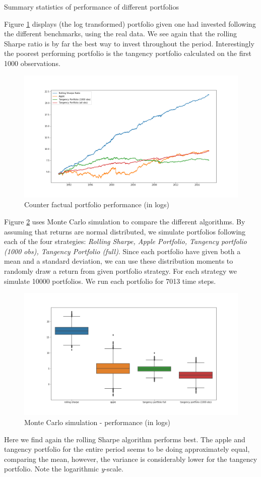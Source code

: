 \begin{table}[ht]
\centering
\caption{Summary statistics of performance of different portfolios}

\label{tab:performance}
\end{table}

Figure \ref{fig:loginvest} displays (the log transformed) portfolio given one had invested following the different benchmarks, using the real data. We see again that the rolling Sharpe ratio is by far the best way to invest throughout the period. Interestingly the poorest performing portfolio is the tangency portfolio calculated on the first 1000 observations.

\begin{figure}[ht]
\centering
\includegraphics[scale=0.45]{figures/log_investment_experiment.png}
\caption{Counter factual portfolio performance (in logs)}
\label{fig:loginvest}
\end{figure}

Figure \ref{fig:logmontecarlo} uses Monte Carlo simulation to compare the different algorithms. By assuming that returns are normal distributed, we simulate portfolios following each of the four strategies: \textit{Rolling Sharpe, Apple Portfolio, Tangency portfolio (1000 obs), Tangency Portfolio (full)}. Since each portfolio have given both a mean and a standard deviation, we can use these distribution moments to randomly draw a return from given portfolio strategy. For each strategy we simulate 10000 portfolios. We run each portfolio for 7013 time steps.

\begin{figure}[ht]
\centering
\includegraphics[scale=0.45]{figures/boxplot_monte_carlo.png}
\caption{Monte Carlo simulation - performance (in logs)}
\label{fig:logmontecarlo}
\end{figure}

Here we find again the rolling Sharpe algorithm performs best. The apple and tangency portfolio for the entire period seems to be doing approximately equal, comparing the mean, however, the variance is considerably lower for the tangency portfolio. Note the logarithmic \textit{y}-scale.
